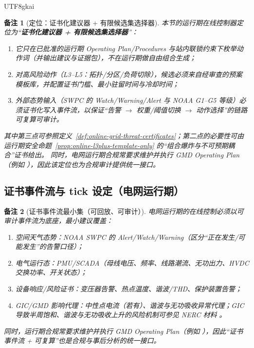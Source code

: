 \documentclass[12pt]{article}
\newtheorem{remark}{备注}[section]
\begin{document}
\begin{CJK*}{UTF8}{gkai}
\begin{remark}[定位：证书化建议器 + 有限候选集选择器]
本节的运行期在线控制器定位为“\textbf{证书化建议器 + 有限候选集选择器}”：
\begin{enumerate}
  \item 它只在已批准的运行期 Operating Plan/Procedures 与站内联锁约束下枚举动作词（并输出建议与证据包），不在运行期做自由组合生成；
  \item 对高风险动作（L3--L5：拓扑/分区/负荷切除），候选必须来自经审查的预案模板库，并配置证书门槛、最小驻留时间与冷却时间；
  \item 外部态势输入（SWPC 的 Watch/Warning/Alert 与 NOAA G1--G5 等级）必须证书化写入事件流，以保证“告警 $\to$ 权重/阈值切换 $\to$ 动作选择”的链路可复算可审计。
\end{enumerate}
其中第三点可参照定义~\ref{def:online-grid-threat-certificates}；第二点的必要性可由运行期安全命题~\ref{prop:online-l3plus-template-only}
  的“组合爆炸与不可预期耦合”证书给出。
同时，电网运行期合规常要求维护并执行 GMD Operating Plan（例如 \cite{ref_nerc_eop_010_1}），因此该定位也为合规审计提供统一接口。
\end{remark}

\subsection{证书事件流与 tick 设定（电网运行期）}
\label{sec:online-grid-event-tick}

\begin{remark}[证书事件流最小集（可回放、可审计）]
电网运行期的在线控制必须以可审计事件流为底座，最小建议覆盖：
\begin{enumerate}
  \item 空间天气态势：\textsf{NOAA SWPC} 的 Alert/Watch/Warning（区分“正在发生/可能发生”的告警口径）\cite{ref_noaa_swpc_alerts}；
  \item 电气运行态：PMU/SCADA（母线电压、频率、线路潮流、无功出力、HVDC 交换功率、开关状态）；
  \item 设备响应/风险证书：变压器告警、热点温度、谐波/THD、保护装置告警；
  \item GIC/GMD 影响代理：中性点电流（若有）、谐波与无功吸收异常代理；GIC 导致半周饱和、谐波与无功吸收上升的风险机制可参见 NERC 材料 \cite{ref_nerc_gmd_report_2012}。
\end{enumerate}
同时，运行期合规常要求维护并执行 GMD Operating Plan（例如 \cite{ref_nerc_eop_010_1}），因此“证书事件流 + 可复算”也是合规与事后分析的统一接口。
\end{remark}


\end{CJK*}
\end{document}
